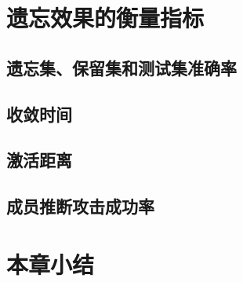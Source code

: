 \section{遗忘效果的衡量指标}

\subsection{遗忘集、保留集和测试集准确率}

\subsection{收敛时间}

\subsection{激活距离}

\subsection{成员推断攻击成功率}

\section{本章小结}

